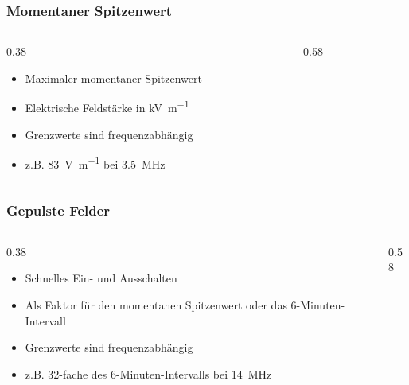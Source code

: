 \begin{frame}
    \frametitle{Momentaner Spitzenwert}
    \begin{columns}
        \begin{column}{0.38\linewidth}
            \begin{itemize}
                \item Maximaler momentaner Spitzenwert
                \item Elektrische Feldstärke in \unit{\kilo\volt\per\metre}
                \item Grenzwerte sind frequenzabhängig
                \item z.B. \qty{83}{\volt\per\metre} bei \qty{3,5}{\mega\hertz}
            \end{itemize}
        \end{column}
        \begin{column}{0.58\linewidth}
        \end{column}
    \end{columns}
\end{frame}

\begin{frame}
    \frametitle{Gepulste Felder}
    \begin{columns}
        \begin{column}{0.38\linewidth}
            \begin{itemize}
                \item Schnelles Ein- und Ausschalten
                \item Als Faktor für den momentanen Spitzenwert oder das 6-Minuten-Intervall
                \item Grenzwerte sind frequenzabhängig
                \item z.B. 32-fache des 6-Minuten-Intervalls bei \qty{14}{\mega\hertz}
            \end{itemize}
        \end{column}
        \begin{column}{0.58\linewidth}
        \end{column}
    \end{columns}
\end{frame}


